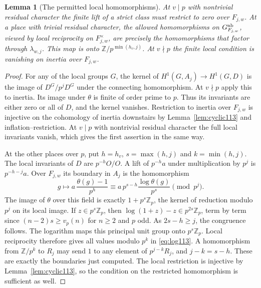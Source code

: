 \documentclass[a4paper,11pt]{article}
\newtheorem{lemma}[proposition]{Lemma}
\theoremstyle{definition}
\theoremstyle{remark}
\newcommand{\ZZ}{\mathbb Z}\newcommand{\ord}{\operatorname{ord}}
\numberwithin{equation}{section}
\begin{document}
\begin{lemma}[The permitted local homomorphisms]\label{lem:local113}
At \(v\mid p\) with nontrivial residual character the finite lift of
a strict class must restrict to zero over \(F_{j,w}\). At a place
with trivial residual character, the allowed homomorphisms on
\(G_{F_{j,w}}^{\rm ab}\), viewed by local reciprocity on
\(F_{j,w}^\times\), are precisely the homomorphisms that factor
through \(\lambda_{w,j}\). This map is onto
\(\ZZ/p^{\min(h_v,j)}\). At \(v\nmid p\) the finite local
condition is vanishing on inertia over \(F_{j,w}\).
\end{lemma}
\begin{proof}
For any of the local groups \(G\), the kernel of
\(H^1(G,A_j)\to H^1(G,D)\) is the image of
\(D^G/p^jD^G\) under the connecting homomorphism. At \(v\nmid p\)
apply this to inertia. Its image under \(\theta\) is finite of
order prime to \(p\). Thus its invariants are either zero or all
of \(D\), and the kernel vanishes. Restriction to inertia over
\(F_{j,w}\) is injective on the cohomology of inertia downstairs
by Lemma~\ref{lem:cyclic113} and inflation--restriction. At
\(v\mid p\) with nontrivial residual character the full local
invariants vanish, which gives the first assertion in the same way.

At the other places over \(p\), put \(h=h_v\), \(s=\max(h,j)\)
and \(k=\min(h,j)\). The local invariants of \(D\) are
\(p^{-h}O/O\). A lift of \(p^{-h}a\) under multiplication by
\(p^j\) is \(p^{-h-j}a\). Over \(F_{j,w}\) its boundary in
\(A_j\) is the homomorphism
\[
 g\longmapsto a\,\frac{\theta(g)-1}{p^h}
       \equiv a\,p^{s-h}\frac{\log\theta(g)}{p^s}
                         \pmod {p^j}.
\]
The image of \(\theta\) over this field is exactly
\(1+p^s\ZZ_p\), the kernel of reduction modulo \(p^j\) on its
local image. If \(z\in p^s\ZZ_p\), then
\(\log(1+z)-z\in p^{2s}\ZZ_p\), term by term since
\((n-2)s\ge v_p(n)\) for \(n\ge2\) and \(p\) odd. As
\(2s-h\ge j\), the congruence follows. The logarithm maps this
principal unit group onto \(p^s\ZZ_p\). Local reciprocity
therefore gives all values modulo \(p^k\) in
\eqref{eq:log113}. A homomorphism from \(\ZZ/p^k\) to \(R_j\)
may send \(1\) to any element of \(p^{j-k}R_j\), and
\(j-k=s-h\). These are exactly the boundaries just computed.
The local restriction is injective by Lemma~\ref{lem:cyclic113},
so the condition on the restricted homomorphism is sufficient
as well.
\end{proof}
\end{document}
